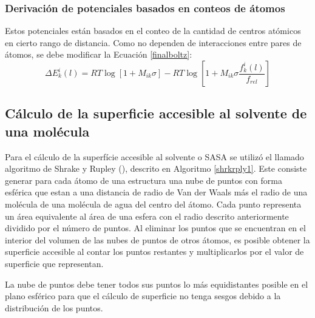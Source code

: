 \cleardoublepage
\subsubsection{Derivación de potenciales basados en conteos de átomos}
\par
Estos potenciales están basados en el conteo de la cantidad de centros atómicos en cierto rango de distancia.
Como no dependen de interacciones entre pares de átomos, se debe modificar la Ecuación \ref{finalboltz}:
\begin{equation}
\Delta E^{i}_{k}(l) = RT\log \left[1 + M_{ik}\sigma\right] - RT\log \left[ 1 + M_{ik}\sigma \frac{f^{i}_{k}(l)}{f_{rel}} \right] \label{surfboltz}
\end{equation}



\subsection{Cálculo de la superficie accesible al solvente de una molécula}
\par
Para el cálculo de la superfície accesible al solvente o SASA se utilizó el llamado algoritmo de Shrake y Rupley (\cite{Shrake1973}), descrito en Algoritmo \ref{shrkrply1}. Este consiste generar para cada átomo de una estructura una nube de puntos con forma esférica que estan a una distancia de radio de Van der Waals más el radio de una molécula de una molécula de agua del centro del átomo. 
Cada punto representa un área equivalente al área de una esfera con el radio descrito anteriormente dividido por el número de puntos. Al eliminar los puntos que se encuentran en el interior del volumen de las nubes de puntos de otros átomos, es posible obtener la superficie accesible al contar los puntos restantes y multiplicarlos por el valor de superficie que representan.
\par
La nube de puntos debe tener todos sus puntos lo más equidistantes posible en el plano esférico para que el cálculo de superficie no tenga sesgos debido a la distribución de los puntos.



